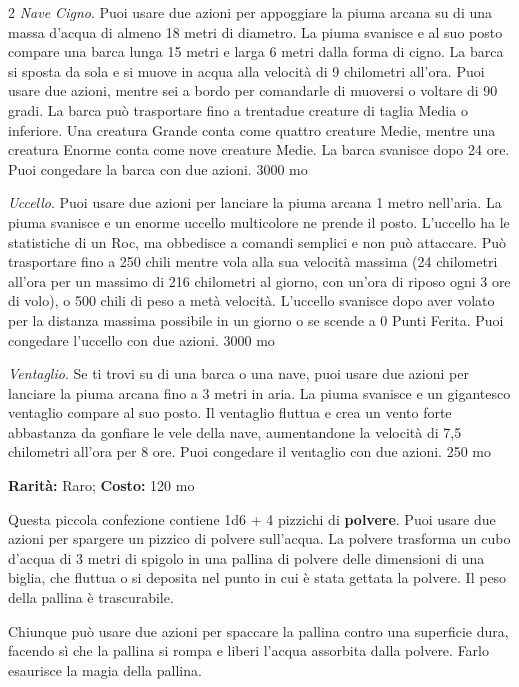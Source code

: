 \begin{multicols}{2}
\emph{Nave Cigno}. Puoi usare due azioni per appoggiare la piuma arcana su di una massa d'acqua di almeno 18 metri di diametro. La piuma svanisce e al suo posto compare una barca lunga 15 metri e larga 6 metri dalla forma di cigno. La barca si sposta da sola e si muove in acqua alla velocità di 9 chilometri all'ora. Puoi usare due azioni, mentre sei a bordo per comandarle di muoversi o voltare di 90 gradi. La barca può trasportare fino a trentadue creature di taglia Media o inferiore. Una creatura Grande conta come quattro creature Medie, mentre una creatura Enorme conta come nove creature Medie. La barca svanisce dopo 24 ore. Puoi congedare la barca con due azioni. 3000 mo

\emph{Uccello}. Puoi usare due azioni per lanciare la piuma arcana 1 metro nell'aria. La piuma svanisce e un enorme uccello multicolore ne prende il posto. L'uccello ha le statistiche di un Roc, ma obbedisce a comandi semplici e non può attaccare. Può trasportare fino a 250 chili mentre vola alla sua velocità massima (24 chilometri all'ora per un massimo di 216 chilometri al giorno, con un'ora di riposo ogni 3 ore di volo), o 500 chili di peso a metà velocità. L'uccello svanisce dopo aver volato per la distanza massima possibile in un giorno o se scende a 0 Punti Ferita. Puoi congedare l'uccello con due azioni. 3000 mo

\emph{Ventaglio}. Se ti trovi su di una barca o una nave, puoi usare due azioni per lanciare la piuma arcana fino a 3 metri in aria. La piuma svanisce e un gigantesco ventaglio compare al suo posto. Il ventaglio fluttua e crea un vento forte abbastanza da gonfiare le vele della nave, aumentandone la velocità di 7,5 chilometri all'ora per 8 ore. Puoi congedare il ventaglio con due azioni. 250 mo


\textbf{Rarità:} Raro; \textbf{Costo:} 120 mo

Questa piccola confezione contiene 1d6 + 4 pizzichi di \textbf{polvere}. Puoi usare due azioni per spargere un pizzico di polvere sull'acqua. La polvere trasforma un cubo d'acqua di 3 metri di spigolo in una pallina di polvere delle dimensioni di una biglia, che fluttua o si deposita nel punto in cui è stata gettata la polvere. Il peso della pallina è trascurabile.

Chiunque può usare due azioni per spaccare la pallina contro una superficie dura, facendo sì che la pallina si rompa e liberi l'acqua assorbita dalla polvere. Farlo esaurisce la magia della pallina.


\end{multicols}

